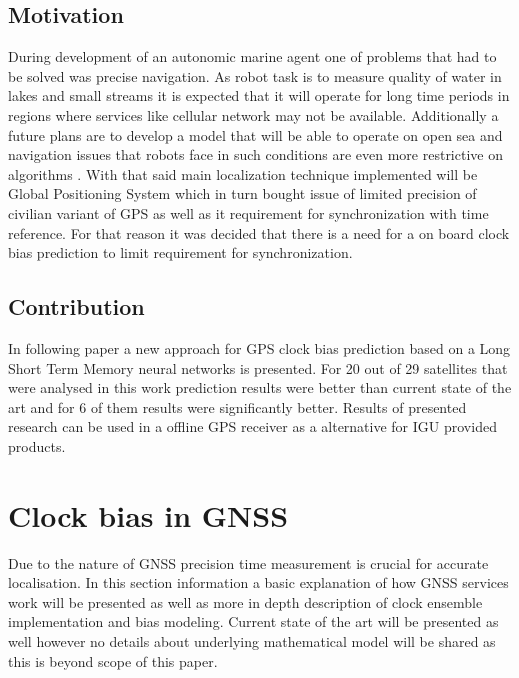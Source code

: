 \documentclass{kybernetika}
\begin{document}
\subsection{Motivation}
During development of an autonomic marine agent one of problems that had to be solved was 
precise navigation. As robot task is to measure quality of water in lakes and small streams
it is expected that it will operate for long time periods in regions where services like 
cellular network may not be available. Additionally a future plans are to develop a model that
will be able to operate on open sea and navigation issues that robots face in such conditions
are even more restrictive on algorithms \cite{Cabrera-Gamez2014}. 
With that said main localization technique implemented
will be Global Positioning System which in turn bought issue of limited precision of civilian
variant of GPS as well as it requirement for synchronization with time reference.
For that reason it was decided that there is a need for a on board clock bias prediction to limit
requirement for synchronization.

\subsection{Contribution}
In following paper a new approach for GPS clock bias prediction based on a Long Short Term Memory
neural networks is presented. For 20 out of 29 satellites that were analysed in this work 
prediction results were better than current state of the art and for 6 of them results were
significantly better. Results of presented research can be used in a offline GPS receiver as 
a alternative for IGU provided products.


\FloatBarrier
\section{Clock bias in GNSS}
Due to the nature of GNSS precision time measurement is crucial for accurate localisation.
In this section information a basic explanation of how GNSS services work will be presented
as well as more in depth description of clock ensemble implementation and bias modeling.
Current state of the art will be presented as well however no details about underlying 
mathematical model will be shared as this is beyond scope of this paper.
\end{document}
